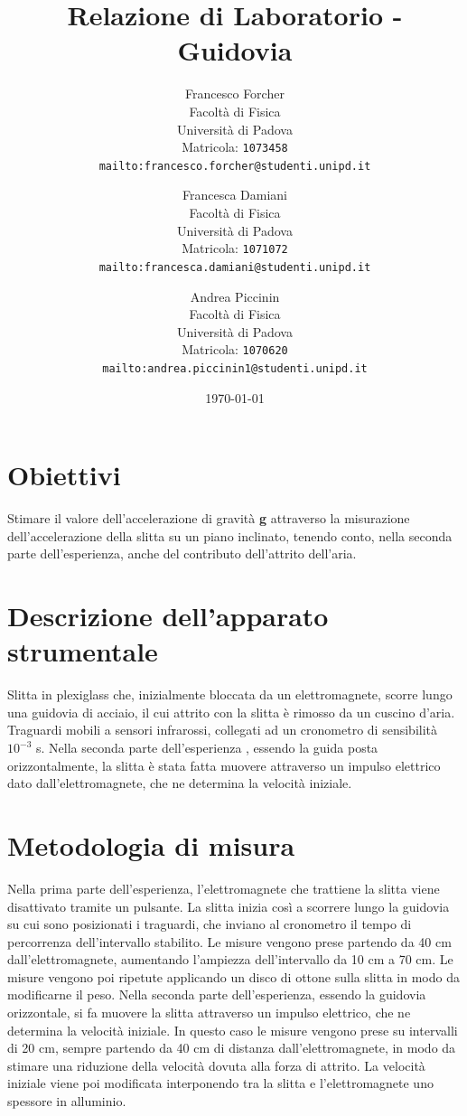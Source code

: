 \documentclass[12pt]{article} %
\title {Relazione di Laboratorio - Guidovia}
\author{Francesco Forcher\\
Facoltà di Fisica\\
Università di Padova\\
Matricola: \texttt{1073458}\\
\texttt{mailto:francesco.forcher@studenti.unipd.it}\\
\and
Francesca Damiani\\ 
Facoltà di Fisica\\
Università di Padova\\
Matricola: \texttt{1071072}\\
\texttt{mailto:francesca.damiani@studenti.unipd.it}\\
\and
Andrea Piccinin\\ 
Facoltà di Fisica\\
Università di Padova\\
Matricola: \texttt{1070620}\\
\texttt{mailto:andrea.piccinin1@studenti.unipd.it}\\
}
\date{\today}
\begin{document}
\maketitle %
\tableofcontents %



        

\section{Obiettivi}
	Stimare il valore dell'accelerazione di gravità \textbf{g} attraverso la misurazione dell'accelerazione della slitta su un piano 
	inclinato, tenendo conto, nella seconda parte dell'esperienza, anche del contributo dell'attrito dell'aria.

\section{Descrizione dell'apparato strumentale}
	Slitta in plexiglass che, inizialmente bloccata da un elettromagnete, scorre lungo una guidovia di acciaio, il cui attrito con la 		slitta è rimosso da un cuscino d'aria. 
	Traguardi mobili a sensori infrarossi, collegati ad un cronometro di sensibilità \(10^{-3}\) s.
	Nella seconda parte dell'esperienza , essendo la guida posta orizzontalmente, la slitta è stata fatta muovere attraverso un 		impulso elettrico dato dall'elettromagnete, che ne determina la velocità iniziale. 
	

\section{Metodologia di misura}
	Nella prima parte dell'esperienza, l'elettromagnete che trattiene la slitta viene disattivato tramite un pulsante. La slitta inizia 		così a scorrere lungo la guidovia su cui sono posizionati i traguardi, che inviano al cronometro il tempo di percorrenza 		dell'intervallo stabilito. Le misure vengono prese partendo da 40 cm dall'elettromagnete, aumentando l'ampiezza dell'intervallo da 10 		cm a 70 cm. Le misure vengono poi ripetute applicando un disco di ottone sulla slitta in modo da modificarne il peso.
	Nella seconda parte dell'esperienza, essendo la guidovia orizzontale, si fa muovere la slitta attraverso un impulso elettrico, che ne 		determina la velocità iniziale. In questo caso le misure vengono prese su intervalli di 20 cm, sempre partendo da 40 cm di distanza 		dall'elettromagnete, in modo da stimare una riduzione della velocità dovuta alla forza di attrito. La velocità iniziale viene poi 		modificata interponendo tra la slitta e l'elettromagnete uno spessore in alluminio.
\end{document}
